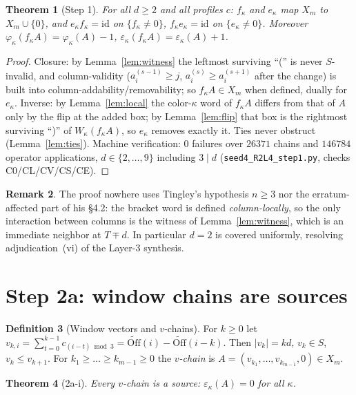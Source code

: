 \documentclass[11pt]{article}
\newtheorem{theorem}{Theorem}
\theoremstyle{definition}
\newtheorem{definition}[theorem]{Definition}
\newtheorem{remark}[theorem]{Remark}
\newcommand{\Off}{\mathrm{Off}}
\newcommand{\Offe}{\widetilde{\Off}}
\newcommand{\eps}{\varepsilon}
\begin{document}
\begin{theorem}[Step 1]\label{thm:step1}
For all $d\ge 2$ and all profiles $c$: $f_\kappa$ and $e_\kappa$ map $X_m$ to
$X_m\cup\{0\}$, and $e_\kappa f_\kappa=\mathrm{id}$ on $\{f_\kappa\ne0\}$,
$f_\kappa e_\kappa=\mathrm{id}$ on $\{e_\kappa\ne0\}$. Moreover
$\varphi_\kappa(f_\kappa A)=\varphi_\kappa(A)-1$,
$\eps_\kappa(f_\kappa A)=\eps_\kappa(A)+1$.
\end{theorem}
\begin{proof}
Closure: by Lemma~\ref{lem:witness} the leftmost surviving ``('' is never
$S$-invalid, and column-validity ($a^{(s-1)}_i\ge j$, $a^{(s)}_i\ge
a^{(s+1)}_i$ after the change) is built into column-addability/removability;
so $f_\kappa A\in X_m$ when defined, dually for $e_\kappa$. Inverse: by
Lemma~\ref{lem:local} the color-$\kappa$ word of $f_\kappa A$ differs from
that of $A$ only by the flip at the added box; by Lemma~\ref{lem:flip} that
box is the rightmost surviving ``)'' of $W_\kappa(f_\kappa A)$, so $e_\kappa$
removes exactly it. Ties never obstruct (Lemma~\ref{lem:ties}).
Machine verification: $0$ failures over $26371$ chains and $146784$ operator
applications, $d\in\{2,\dots,9\}$ including $3\mid d$
(\texttt{seed4\_R2L4\_step1.py}, checks C0/CL/CV/CS/CE).
\end{proof}

\begin{remark}
The proof nowhere uses Tingley's hypothesis $n\ge3$ nor the erratum-affected
part of his \S4.2: the bracket word is defined \emph{column-locally}, so the
only interaction between columns is the witness of Lemma~\ref{lem:witness},
which is an immediate neighbor at $T\mp d$. In particular $d=2$ is covered
uniformly, resolving adjudication~(vi) of the Layer-3 synthesis.
\end{remark}

\section{Step 2a: window chains are sources}

\begin{definition}[Window vectors and $v$-chains]
For $k\ge0$ let $v_{k,i}=\sum_{t=0}^{k-1}c_{(i-t)\bmod 3}
=\Offe(i)-\Offe(i-k)$. Then $|v_k|=kd$, $v_k\in S$, $v_k\le v_{k+1}$.
For $k_1\ge\dots\ge k_{m-1}\ge0$ the \emph{$v$-chain} is
$A=(v_{k_1},\dots,v_{k_{m-1}},0)\in X_m$.
\end{definition}

\begin{theorem}[2a-i]\label{thm:sources}
Every $v$-chain is a source: $\eps_\kappa(A)=0$ for all $\kappa$.
\end{theorem}
\end{document}
